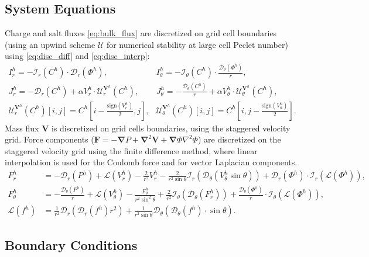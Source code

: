\documentclass[preprint,10pt]{elsarticle}
\newcommand{\sign}{\ensuremath{\mathrm{sign}}}
\newcommand{\pars}[1]{\left(#1\right)}
\newcommand\Laplacian{\nabla^2}
\newcommand\bnabla{\boldsymbol{\nabla}}
\newcommand\bLaplacian{\boldsymbol{\nabla}^2}
\newcommand\bV{\boldsymbol{V}}
\newcommand\bF{\boldsymbol{F}}
\newcommand\cI{\mathcal{I}}
\newcommand\cD{\mathcal{D}}
\newcommand\cL{\mathcal{L}}
\begin{document}
\subsection{System Equations} \label{sec:disc_equations}
Charge and salt fluxes \eqref{eq:bulk_flux} are discretized on grid cell boundaries 
(using an upwind scheme $\mathcal{U}$ for numerical stability at large cell Peclet number)  
using \eqref{eq:disc_diff} and \eqref{eq:disc_interp}:
\begin{align} 
\nonumber
I^h_r = -\cI_r(C^h) \cdot \cD_r(\varPhi^h), &
I^h_\theta = -\cI_\theta(C^h) \cdot \frac{\cD_\theta(\varPhi^h)}{r}, \\
J^h_r = -\cD_r(C^h) + \alpha V^h_r \cdot \mathcal{U}^{\bV^h}_r (C^h), &
J^h_\theta = -\frac{\cD_\theta(C^h)}{r} + \alpha V^h_\theta \cdot \mathcal{U}^{\bV^h}_\theta (C^h), 
\\ \nonumber
 \mathcal{U}^{\bV^h}_r(C^h)[i,j] = C^h\left[i-\frac{\sign(V^h_r)}{2}, j\right], &
 \mathcal{U}^{\bV^h}_\theta(C^h)[i,j] = C^h\left[i, j-\frac{\sign(V^h_\theta)}{2}\right]. 
\end{align}
Mass flux $\bV$ is discretized on grid cells boundaries, 
using the staggered velocity grid.
Force components ($\bF = -\bnabla P + \bLaplacian \bV + \bnabla \varPhi \Laplacian \varPhi$) 
are discretized on the staggered velocity grid using the finite difference
method, where linear interpolation is used for the Coulomb force and 
for vector Laplacian components.
\begin{align}
\nonumber
F^h_r &= -\cD_r(P^h) 
          + \cL(V^h_r) - \frac{2}{r^2} V^h_r 
		  - \frac{2}{r^2 \sin\theta} \cI_r(\cD_\theta (V^h_\theta \sin\theta))
          + \cD_r(\varPhi^h) \cdot \cI_r(\cL(\varPhi^h)), \\
\nonumber
F^h_\theta &= -\frac{\cD_\theta(P^h)}{r} 
		  + \cL(V^h_\theta) - \frac{F^h_\theta}{r^2 \sin^2\theta} 
		  + \frac{2}{r^2} \cI_\theta(\cD_\theta(F^h_r))
		  + \frac{\cD_\theta(\varPhi^h)}{r} \cdot \cI_\theta(\cL(\varPhi^h)), \\
\cL(f^h) &= \frac{1}{r^2}\cD_r\pars{\cD_r(f^h) r^2} + 
\frac{1}{r^2 \sin\theta} \cD_\theta\pars{\cD_\theta(f^h) \cdot \sin\theta}.
\end{align}


\subsection{Boundary Conditions} \label{sec:disc_boundary}
\end{document}
